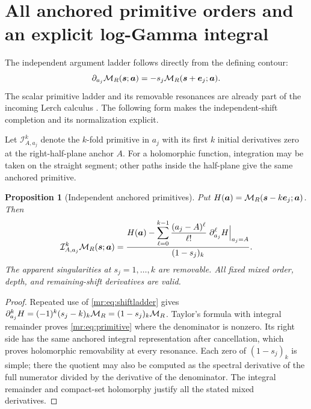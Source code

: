 \documentclass[11pt,letterpaper]{article}
\newtheorem{proposition}[theorem]{Proposition}
\theoremstyle{definition}\newtheorem{definition}[theorem]{Definition}
\theoremstyle{remark}\newtheorem{remark}[theorem]{Remark}
\begin{document}
\section{All anchored primitive orders and an explicit log-Gamma integral}
\label{mr:sec:primitives}
The independent argument ladder follows directly from the defining contour:
\begin{equation}\label{mr:eq:shiftladder}
 \partial_{a_j}\mathcal M_R(\boldsymbol s;\boldsymbol a)
 =-s_j\mathcal M_R(\boldsymbol s+\boldsymbol e_j;\boldsymbol a).
\end{equation}
The scalar primitive ladder and its removable resonances are already
part of the incoming Lerch calculus \cite{CDL,Tilt}. The following
form makes the independent-shift completion and its normalization explicit.

Let $\mathcal I^k_{A,a_j}$ denote the $k$-fold primitive in $a_j$
with its first $k$ initial derivatives zero at the right-half-plane
anchor $A$. For a holomorphic function, integration may be taken on
the straight segment; other paths inside the half-plane give the same
anchored primitive.

\begin{proposition}[Independent anchored primitives]\label{mr:prop:primitive}
Put
$H(\boldsymbol a)=\mathcal M_R(\boldsymbol s-k\boldsymbol e_j;\boldsymbol a)$.
Then
\begin{equation}\label{mr:eq:primitive}
 \mathcal I^k_{A,a_j}\mathcal M_R(\boldsymbol s;\boldsymbol a)
 =\frac{H(\boldsymbol a)-
       \displaystyle\sum_{\ell=0}^{k-1}\frac{(a_j-A)^\ell}{\ell!}
         \left.\partial_{a_j}^{\ell}H\right|_{a_j=A}}
       {(1-s_j)_k}.
\end{equation}
The apparent singularities at $s_j=1,\ldots,k$ are removable.
All fixed mixed order, depth, and remaining-shift derivatives are valid.
\end{proposition}
\begin{proof}
Repeated use of \eqref{mr:eq:shiftladder} gives
$\partial_{a_j}^kH=(-1)^k(s_j-k)_k\mathcal M_R=(1-s_j)_k\mathcal M_R$.
Taylor's formula with integral remainder proves \eqref{mr:eq:primitive}
where the denominator is nonzero. Its right side has the same anchored
integral representation after cancellation, which proves holomorphic
removability at every resonance. Each zero of $(1-s_j)_k$ is simple;
there the quotient may also be computed as the spectral derivative
of the full numerator divided by the derivative of the denominator.
The integral remainder and compact-set holomorphy justify all the
stated mixed derivatives.
\end{proof}
\end{document}
